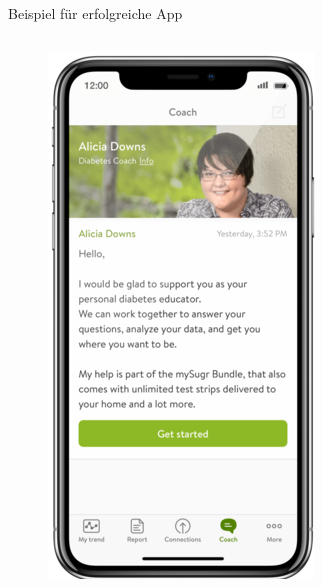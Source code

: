 \documentclass[aspectratio=169,t]{beamer}
\begin{document}
\begin{frame}{Beispiel für erfolgreiche App}
\begin{columns}
\begin{column}{0.6\textwidth}
\begin{figure}
\begin{minipage}{0.33\textwidth}
                    \includegraphics[width=\textwidth]{Bilder/mysugr1.png}
                \end{minipage}%
                \begin{minipage}{0.33\textwidth}

\end{minipage}
\end{figure}
\end{column}
\end{columns}
\end{frame}
\end{document}
